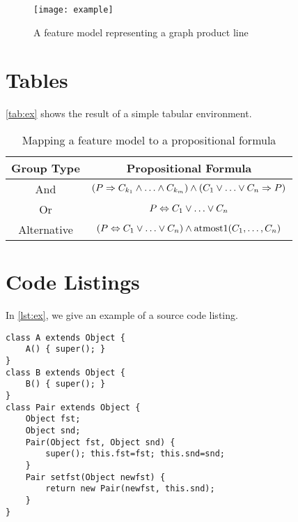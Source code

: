 \begin{figure}[htbp]
	\centering
		\texttt{[image: example]}
	\caption{A feature model representing a graph product line}
	\label{fig:ex}
\end{figure}

\section{Tables}

\vref{tab:ex} shows the result of a simple tabular environment.

\begin{table}[htbp]
	\centering
		\begin{tabular}{cc}\toprule
			Group Type & Propositional Formula\\\midrule
			And & $(P \Rightarrow C_{k_1} \wedge\ldots\wedge C_{k_m}) \wedge (C_1\vee\ldots\vee C_n \Rightarrow P)$\\\addlinespace
			Or & $P \Leftrightarrow C_1\vee\ldots\vee C_n$\\\addlinespace
			Alternative & $(P \Leftrightarrow C_1\vee\ldots\vee C_n) \wedge \mbox{atmost}1(C_1,\ldots,C_n)$\\
			\bottomrule
		\end{tabular}
	\caption{Mapping a feature model to a propositional formula}
	\label{tab:ex}
\end{table}

\section{Code Listings}

In \vref{lst:ex}, we give an example of a source code listing. 

\begin{lstlisting}[style=Java,float=htb,caption={Java source code},label={lst:ex}]
class A extends Object {
	A() { super(); }
}
class B extends Object {
	B() { super(); }
}
class Pair extends Object {
	Object fst;
	Object snd;
	Pair(Object fst, Object snd) {
		super(); this.fst=fst; this.snd=snd;
	}
	Pair setfst(Object newfst) {
		return new Pair(newfst, this.snd);
	}
}
\end{lstlisting}
